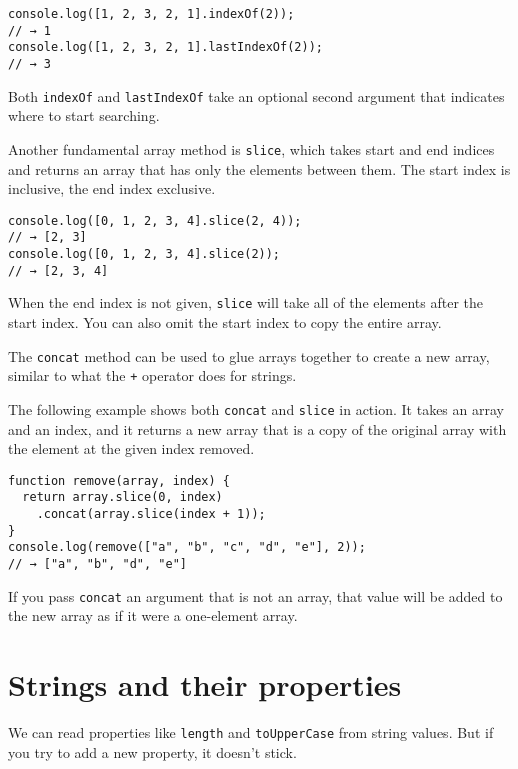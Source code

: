 \begin{lstlisting}
console.log([1, 2, 3, 2, 1].indexOf(2));
// → 1
console.log([1, 2, 3, 2, 1].lastIndexOf(2));
// → 3
\end{lstlisting}
\noindent

Both \lstinline`indexOf` and \lstinline`lastIndexOf` take an optional second argument that indicates where to start searching.

Another fundamental array method is \lstinline`slice`, which takes start and end indices and returns an array that has only the elements between them. The start index is inclusive, the end index exclusive.

\begin{lstlisting}
console.log([0, 1, 2, 3, 4].slice(2, 4));
// → [2, 3]
console.log([0, 1, 2, 3, 4].slice(2));
// → [2, 3, 4]
\end{lstlisting}
\noindent{}

When the end index is not given, \lstinline`slice` will take all of the elements after the start index. You can also omit the start index to copy the entire array.

The \lstinline`concat` method can be used to glue arrays together to create a new array, similar to what the \lstinline`+` operator does for strings.

The following example shows both \lstinline`concat` and \lstinline`slice` in action. It takes an array and an index, and it returns a new array that is a copy of the original array with the element at the given index removed.

\begin{lstlisting}
function remove(array, index) {
  return array.slice(0, index)
    .concat(array.slice(index + 1));
}
console.log(remove(["a", "b", "c", "d", "e"], 2));
// → ["a", "b", "d", "e"]
\end{lstlisting}
\noindent

If you pass \lstinline`concat` an argument that is not an array, that value will be added to the new array as if it were a one-element array.

\section{Strings and their properties}

We can read properties like \lstinline`length` and \lstinline`toUpperCase` from string values. But if you try to add a new property, it doesn't stick.

